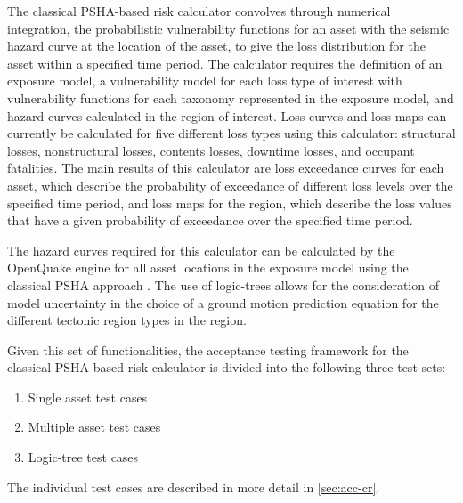The classical PSHA-based risk calculator convolves through numerical integration, the probabilistic vulnerability functions for an asset with the seismic hazard curve at the location of the asset, to give the loss distribution for the asset within a specified time period. The calculator requires the definition of an exposure model, a vulnerability model for each loss type of interest with vulnerability functions for each taxonomy represented in the exposure model, and hazard curves calculated in the region of interest. Loss curves and loss maps can currently be calculated for five different loss types using this calculator: structural losses, nonstructural losses, contents losses, downtime losses, and occupant fatalities. The main results of this calculator are loss exceedance curves for each asset, which describe the probability of exceedance of different loss levels over the specified time period, and loss maps for the region, which describe the loss values that have a given probability of exceedance over the specified time period.

The hazard curves required for this calculator can be calculated by the OpenQuake engine for all asset locations in the exposure model using the classical PSHA approach \citep{cornell1968, mcguire1976}. The use of logic-trees allows for the consideration of model uncertainty in the choice of a ground motion prediction equation for the different tectonic region types in the region.

Given this set of functionalities, the acceptance testing framework for the classical PSHA-based risk calculator is divided into the following three test sets:

\begin{enumerate}
	\item Single asset test cases
	\item Multiple asset test cases
	\item Logic-tree test cases
\end{enumerate}

The individual test cases are described in more detail in \ref{sec:acc-cr}.
